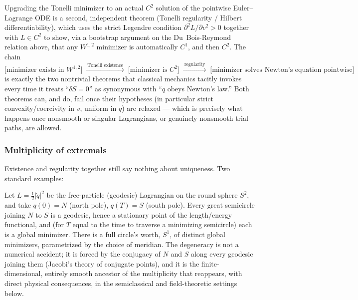 Upgrading the Tonelli minimizer to an actual $C^2$ solution of the pointwise
Euler--Lagrange ODE is a second, independent theorem (Tonelli regularity /
Hilbert differentiability), which uses the strict Legendre condition
$\partial^2 L/\partial v^2 > 0$ together with $L\in C^2$ to show, via a
bootstrap argument on the Du~Bois-Reymond relation above, that any $W^{1,2}$
minimizer is automatically $C^1$, and then $C^2$. The chain
\[
\text{[minimizer exists in } W^{1,2}\text{]} \;\xrightarrow{\ \text{Tonelli
existence}\ }\; \text{[minimizer is }C^2\text{]} \;\xrightarrow{\
\text{regularity}\ }\; \text{[minimizer solves Newton's equation pointwise]}
\]
is exactly the two nontrivial theorems that classical mechanics tacitly invokes
every time it treats ``$\delta S=0$'' as synonymous with ``$q$ obeys Newton's
law.'' Both theorems can, and do, fail once their hypotheses (in particular
strict convexity/coercivity in $v$, uniform in $q$) are relaxed --- which is
precisely what happens once nonsmooth or singular Lagrangians, or genuinely
nonsmooth trial paths, are allowed.

\subsubsection{Multiplicity of extremals}

Existence and regularity together still say nothing about uniqueness. Two
standard examples:

\begin{example}
Let $L=\tfrac12|\dot q|^2$ be the free-particle (geodesic) Lagrangian on the
    round sphere $S^2$, and take $q(0)=N$ (north pole), $q(T)=S$ (south pole).
    Every great semicircle joining $N$ to $S$ is a geodesic, hence a stationary
    point of the length/energy functional, and (for $T$ equal to the time to
    traverse a minimizing semicircle) each is a global minimizer. There is a
    full circle's worth, $S^1$, of distinct global minimizers, parametrized by
    the choice of meridian. The degeneracy is not a numerical accident; it is
    forced by the conjugacy of $N$ and $S$ along every geodesic joining them
    (Jacobi's theory of conjugate points), and it is the finite-dimensional,
    entirely smooth ancestor of the multiplicity that reappears, with direct
    physical consequences, in the semiclassical and field-theoretic settings
    below.
\end{example}

